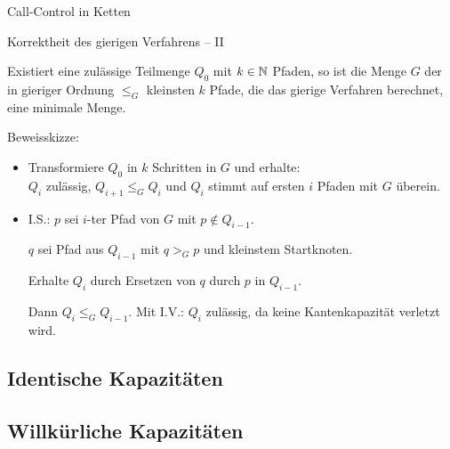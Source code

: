 \begin{section}{Call-Control in Ketten}
\begin{frame}{Korrektheit des gierigen Verfahrens -- II}
\begin{lemma}\label{lem:optimalityGreedyAlgorithm}
	Existiert eine zulässige Teilmenge $Q_0$ mit $k \in \mathbb N$ Pfaden, so ist die
	Menge $G$ der in gieriger Ordnung $\leq_G$ kleinsten $k$ Pfade, die das gierige Verfahren berechnet, eine minimale Menge.
\end{lemma}
\pause
Beweisskizze:
\begin{itemize}
	\item Transformiere $Q_0$ in $k$ Schritten in $G$ und erhalte:\\ $Q_i$ zulässig, $Q_{i+1} \leq_G Q_i$ und $Q_i$ stimmt auf ersten $i$ Pfaden mit $G$ überein.
	\pause
	\item I.S.: $p$ sei $i$-ter Pfad von $G$ \pause mit $p \notin Q_{i-1}$. 
		
		\pause $q$ sei Pfad aus $Q_{i-1}$ mit $q >_G p$ und kleinstem Startknoten.
		
		\pause Erhalte $Q_i$ durch Ersetzen von $q$ durch $p$ in $Q_{i-1}$.
		
		\pause Dann $Q_i \leq_G Q_{i-1}$. \pause Mit I.V.: $Q_i$ zulässig, da keine Kantenkapazität verletzt wird.
\end{itemize}
\end{frame}
	
\subsection{Identische Kapazitäten}
\begin{frame}


\end{frame}


\subsection{Willkürliche Kapazitäten}
\begin{frame}
	
\end{frame}
\end{section}